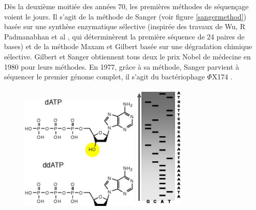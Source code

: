 Dès la deuxième moitiée des années 70, les premières méthodes de séquençage voient le jours. Il s'agit de la méthode de Sanger \cite{Sanger1975} (voir figure \ref{sangermethod}) basée sur une synthèse enzymatique sélective (inspirée des travaux de Wu, R Padmanabhan et al \cite{WU1972}, qui déterminèrent la première séquence de 24 paires de bases) et de la méthode Maxam et Gilbert \cite{Maxam1977} basée sur une dégradation chimique sélective. Gilbert et Sanger obtiennent tous deux le prix Nobel de médecine en 1980 pour leurs méthodes. En 1977, grâce à sa méthode, Sanger parvient à séquencer le premier génome complet, il s'agit du bactériophage $\Phi$X174 \cite{Sanger1977}.\\

\begin{figure}[H]
\begin{center}
\includegraphics[width=0.5\textwidth]{ddatp.png}\hspace{1.3cm} \includegraphics[width=0.21\textwidth]{gelelectrophoresis.jpg}
\vspace{0.5cm}


\end{center}
\end{figure}
